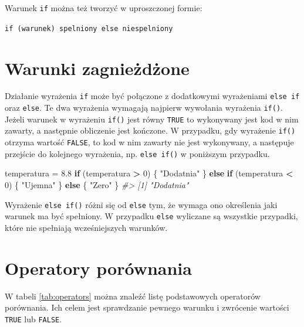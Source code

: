 \documentclass[paper=6in:9in,pagesize=pdftex,headinclude=on,footinclude=on,10pt]{scrbook}
\newenvironment{Shaded}{\begin{snugshade}}{\end{snugshade}}
\newcommand{\CommentTok}[1]{\textcolor[rgb]{0.56,0.35,0.01}{\textit{#1}}}
\newcommand{\ControlFlowTok}[1]{\textcolor[rgb]{0.13,0.29,0.53}{\textbf{#1}}}
\newcommand{\DecValTok}[1]{\textcolor[rgb]{0.00,0.00,0.81}{#1}}
\newcommand{\FloatTok}[1]{\textcolor[rgb]{0.00,0.00,0.81}{#1}}
\newcommand{\NormalTok}[1]{#1}
\newcommand{\OperatorTok}[1]{\textcolor[rgb]{0.81,0.36,0.00}{\textbf{#1}}}
\newcommand{\StringTok}[1]{\textcolor[rgb]{0.31,0.60,0.02}{#1}}
\let\BeginKnitrBlock\begin \let\EndKnitrBlock\end
\begin{document}
\BeginKnitrBlock{rmdinfo}
Warunek \texttt{if} można też tworzyć w uproszczonej formie:

\texttt{if\ (warunek)\ spelniony\ else\ niespelniony}
\EndKnitrBlock{rmdinfo}

\hypertarget{warunki-zagniezdzone}{%
\section{Warunki zagnieżdżone}\label{warunki-zagniezdzone}}

Działanie wyrażenia \texttt{if} może być połączone z dodatkowymi wyrażeniami \texttt{else\ if} oraz \texttt{else}.
Te dwa wyrażenia wymagają najpierw wywołania wyrażenia \texttt{if()}.
Jeżeli warunek w wyrażeniu \texttt{if()} jest równy \texttt{TRUE} to wykonywany jest kod w nim zawarty, a następnie obliczenie jest kończone.
W przypadku, gdy wyrażenie \texttt{if()} otrzyma wartość \texttt{FALSE}, to kod w nim zawarty nie jest wykonywany, a następuje przejście do kolejnego wyrażenia, np. \texttt{else\ if()} w poniższym przypadku.

\begin{Shaded}
\begin{Highlighting}[]
\NormalTok{temperatura =}\StringTok{ }\FloatTok{8.8}
\ControlFlowTok{if}\NormalTok{ (temperatura }\OperatorTok{>}\StringTok{ }\DecValTok{0}\NormalTok{) \{}
  \StringTok{"Dodatnia"}
\NormalTok{\} }\ControlFlowTok{else} \ControlFlowTok{if}\NormalTok{ (temperatura }\OperatorTok{<}\StringTok{ }\DecValTok{0}\NormalTok{) \{}
  \StringTok{"Ujemna"}
\NormalTok{\} }\ControlFlowTok{else}\NormalTok{ \{}
  \StringTok{"Zero"}
\NormalTok{\}}
\CommentTok{#> [1] "Dodatnia"}
\end{Highlighting}
\end{Shaded}

Wyrażenie \texttt{else\ if()} różni się od \texttt{else} tym, że wymaga ono określenia jaki warunek ma być spełniony.
W przypadku \texttt{else} wyliczane są wszystkie przypadki, które nie spełniają wcześniejszych warunków.

\hypertarget{operatory-porownania}{%
\section{Operatory porównania}\label{operatory-porownania}}

W tabeli \ref{tab:operators} można znaleźć listę podstawowych operatorów porównania.
Ich celem jest sprawdzanie pewnego warunku i zwrócenie wartości \texttt{TRUE} lub \texttt{FALSE}.
\end{document}
